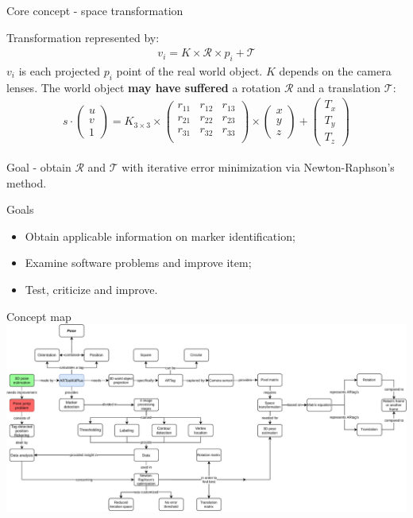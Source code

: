 \documentclass[10pt]{beamer}
\begin{document}
\begin{frame}[fragile]{Core concept - space transformation}

  Transformation represented by:
  \begin{align*}
    v_i=K\times\mathcal{R}\times p_i+\mathcal{T}
  \end{align*}
  $v_i$ is each projected $p_i$ point of the real world object. $K$ depends on the camera lenses.
  The world object \textbf{may have suffered} a rotation $\mathcal{R}$ and a translation $\mathcal{T}$:
  \begin{align}
    s \cdot
    \begin{pmatrix}
      u \\ v \\ 1
    \end{pmatrix}
    =
    K_{3 \times 3} \times
    \begin{pmatrix}
    r_{11} & r_{12} & r_{13} \\
    r_{21} & r_{22} & r_{23} \\
    r_{31} & r_{32} & r_{33} \\
    \end{pmatrix}
    \times
    \begin{pmatrix}
      x \\ y \\ z
    \end{pmatrix}
    +
    \begin{pmatrix}
      T_x \\ T_y \\ T_z
    \end{pmatrix}
  \end{align}

  Goal - obtain $\mathcal{R}$ and $\mathcal{T}$ with iterative error minimization via Newton-Raphson's method.
\end{frame}
\begin{frame}[fragile]{Goals}
  \begin{itemize}
    \item Obtain applicable information on marker identification;
    \item Examine software problems and improve item;
    \item Test, criticize and improve.
  \end{itemize}

\end{frame}

\begin{frame}[fragile]{Concept map}
  \includegraphics[scale=0.35]{./concept_map/concept_map.pdf}
\end{frame}
\end{document}

